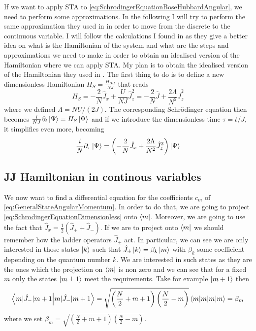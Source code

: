 \documentclass{article}
\begin{document}
If we want to apply STA to \cref{eq:SchrodingerEquationBoseHubbardAngular}, we need to perform some approximations.
In the following I will try to perform the same approximation they used in \cite{BoseEinsteinCJulia2010} in order to move from the discrete to the continuous variable.
I will follow the calculations I found in \cite{BoseEinsteinCJulia2010} as they give a better idea on what is the Hamiltonian of the system and what are the steps and approximations we need to make in order to obtain an idealised version of the Hamiltonian where we can apply STA.
My plan is to obtain the idealised version of the Hamiltonian they used in \cite{FastGenerationJulia2012}.
The first thing to do is to define a new dimensionless Hamiltonian $ H_{S} = \frac{H_{BH}}{NJ} $ that reads
\begin{equation}
	\label{eq:DimensionlessBoseHubbardHamiltonian}
	H_{S} = -\frac{2}{N}\hat{J}_x +\frac{U}{NJ}\hat{J}_z ^{2} = -\frac{2}{N} \hat{J}+ \frac{2\Lambda}{N^2}\hat{J}_z^2
\end{equation}
where we defined $ \Lambda = NU/(2J) $.
The corresponding Schr{\"o}dinger equation then becomes $ \frac{i}{NJ}\partial_t\ket{\Psi} = H_{S}\ket{\Psi} $ and if we introduce the dimensionless time $ \tau = t/J $, it simplifies even more, becoming
\begin{equation}
	\label{eq:SchrodingerEquationDimensionless}
	\frac{i}{N}\partial_{\tau} \ket{\Psi} =
	\left(
	-\frac{2}{N} \hat{J}_{x}+ \frac{2\Lambda}{N^2}\hat{J}_z^2
	\right)\ket{\Psi}
\end{equation}

\subsection{JJ Hamiltonian in continous variables}
We now want to find a differential equation for the coefficients $ c_{m} $ of \cref{eq:GeneralStateAngularMomentum}.
In order to do that, we are going to project \cref{eq:SchrodingerEquationDimensionless} onto $ \bra{m} $.
Moreover, we are going to use the fact that $ \hat{J}_x = \frac{1}{2}\left(\hat{J}_{+} + \hat{J}_{-}\right) $.
If we are to project onto $ \bra{m} $ we should remember how the ladder operators $ \hat{J}_{\pm} $ act.
In particular, we can see we are only interested in those states $ \ket{k} $ such that $ \hat{J}_{\pm}\ket{k} = \beta_{k} \ket{m} $ with $ \beta_{k} $ some coefficient depending on the quantum number $ k $.
We are interested in such states as they are the ones which the projection on $ \bra{m} $ is non zero and we can see that for a fixed $ m $   only the states $ \ket{m \pm 1} $ meet the requirements.
Take for example $ \ket{m +1} $ then
\begin{equation}
	\label{eq:LadderOperatorsProjected}
	\braket{m|\hat{J}_{-} |m + 1 } = \sqrt{
		\left(\frac{N}{2} + m +1\right)
		\left(\frac{N}{2} -m\right)
	}
	\braket{m|m}
	=
	\beta_{m}
\end{equation}
where we set $ \beta_{m} =\sqrt {    \left(\frac{N}{2} + m +1\right)  \left(\frac{N}{2} -m\right) }$.\\
\end{document}
